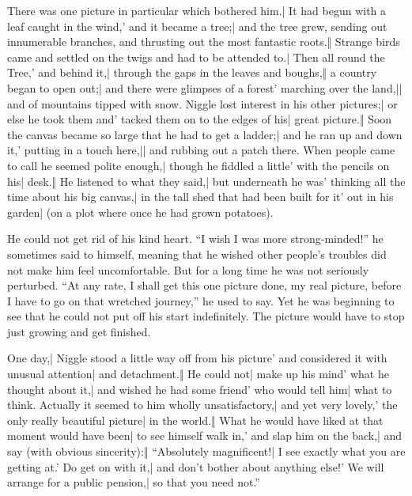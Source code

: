 \begin{itemize}
\halfone There was one picture in particular which bothered him.| It had begun with a leaf caught in the wind,' and it became a tree;| and the tree grew, sending out innumerable branches, and thrusting out the most fantastic roots.‖
\halftwo Strange birds came and settled on the twigs and had to be attended to.| Then all round the Tree,' and behind it,| through the gaps in the leaves and boughs,‖ a country began to open out;| and there were glimpses of a forest' marching over the land,|| and of mountains tipped with snow.
\halfone Niggle lost interest in his other pictures;| or else he took them and' tacked them on to the edges of his| great picture.‖ Soon the canvas became so large that he had to get a ladder;| and he ran up and down it,' putting in a touch here,|| and rubbing out a patch there.
\halftwo When people came to call he seemed polite enough,| though he fiddled a little' with the pencils on his| desk.‖ He listened to what they said,| but underneath he was' thinking all the time about his big canvas,| in the tall shed that had been built for it' out in his garden| (on a plot where once he had grown potatoes).
\end{itemize}

He could not get rid of his kind heart. “I wish I was more strong-minded!” he sometimes said to himself, meaning that he wished other people’s troubles did not make him feel uncomfortable. But for a long time he was not seriously perturbed. “At any rate, I shall get this one picture done, my real picture, before I have to go on that wretched journey,” he used to say. Yet he was beginning to see that he could not put off his start indefinitely. The picture would have to stop just growing and get finished.


\begin{itemize}
\halfone One day,| Niggle stood a little way off from his picture' and considered it with unusual attention| and detachment.‖ He could not| make up his mind' what he thought about it,| and wished he had some friend' who would tell him| what to think.
\halftwo Actually it seemed to him wholly unsatisfactory,| and yet very lovely,' the only really beautiful picture| in the world.‖
\halfone What he would have liked at that moment would have been| to see himself walk in,' and slap him on the back,| and say (with obvious sincerity):‖ “Absolutely magnificent!| I see exactly what you are getting at.' Do get on with it,| and don’t bother about anything else!' We will arrange for a public pension,| so that you need not.”
\end{itemize}

